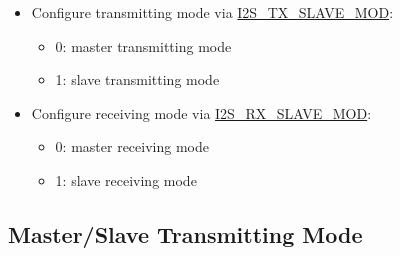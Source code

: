 \documentclass[main\_\_EN.tex]{subfiles}
\begin{document}
\begin{itemize}
    \item Configure transmitting mode via \hyperref[fielddesc:I2STXSLAVEMOD]{I2S\_TX\_SLAVE\_MOD}:
    \begin{itemize}
        \item 0: master transmitting mode
        \item 1: slave transmitting mode
    \end{itemize}
    \item Configure receiving mode via \hyperref[fielddesc:I2SRXSLAVEMOD]{I2S\_RX\_SLAVE\_MOD}:
    \begin{itemize}
        \item 0: master receiving mode
        \item 1: slave receiving mode
    \end{itemize}
\end{itemize}

\subsection{Master/Slave Transmitting Mode} \label{subsubsection:master/slave_transmitting_mode}
\end{document}
